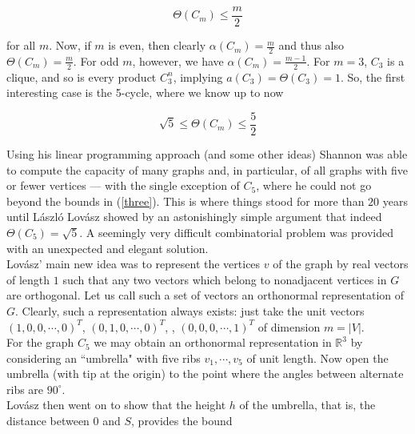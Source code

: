 \documentclass[12pt]{memoir}
\begin{document}
\begin{equation*}
  \Theta(C_m) \leq \frac{m}{2}
\end{equation*}

for all $m$. Now, if $m$ is even, then clearly $\alpha(C_m) = \frac{m}{2}$
and thus also $\Theta(C_m) = \frac{m}{2}$. For odd $m$, however, we have $\alpha(C_m) = \frac{m-1}{2}$. 
For $m = 3$, $C_3$ is a clique, and so is every product $C_3^n$, implying $a(C_3) = \Theta(C_3) = 1$. 
So, the first interesting case is the 5-cycle, where we know up to now 

\begin{equation}
  \sqrt{5} \leq \Theta(C_m) \leq \frac{5}{2} \label{three}
\end{equation}

Using his linear programming approach (and some other ideas) Shannon 
was able to compute the capacity of many graphs and, in particular, of all 
graphs with five or fewer vertices --- with the single exception of $C_5$, where 
he could not go beyond the bounds in (\ref{three}). This is where things stood for 
more than $20$ years until L\'aszl\'o Lov\'asz showed by an astonishingly simple argument
that indeed $\Theta(C_5) = \sqrt{5}$. A seemingly very difficult combinatorial 
problem was provided with an unexpected and elegant solution.\\

Lov\'asz' main new idea was to represent the vertices $v$ of the graph by 
real vectors of length $1$ such that any two vectors which belong to nonadjacent 
vertices in $G$ are orthogonal. Let us call such a set of vectors 
an orthonormal representation of $G$. Clearly, such a representation always 
exists: just take the unit vectors $(1,0,0,\dotsb,0)^T$, $(0,1,0,\dotsb,0)^T$, \dotsb,
$(0,0,0,\dotsb,1)^T$ of dimension $m=|V|$.\\


For the graph $C_5$ we may obtain an orthonormal representation in $\mathbb{R}^3$ by 
considering an ``umbrella" with five ribs $v_1, \dotsb , v_5$ of unit length. Now 
open the umbrella (with tip at the origin) to the point where the angles 
between alternate ribs are $90^\circ$. \\
Lov\'asz then went on to show that the height $h$ of the umbrella, that is, the 
distance between $0$ and $S$, provides the bound
\end{document}
